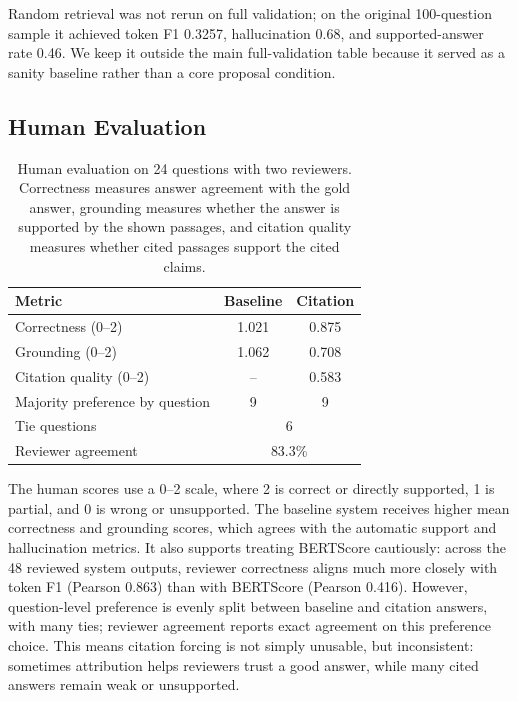 \documentclass[11pt]{article}
\begin{document}
Random retrieval was not rerun on full validation; on the original 100-question sample it achieved token F1 0.3257, hallucination 0.68, and supported-answer rate 0.46. We keep it outside the main full-validation table because it served as a sanity baseline rather than a core proposal condition.

\subsection{Human Evaluation}

\begin{table}[H]
\centering
\small
\begin{tabular}{lcc}
\toprule
Metric & Baseline & Citation \\
\midrule
Correctness (0--2) & 1.021 & 0.875 \\
Grounding (0--2) & 1.062 & 0.708 \\
Citation quality (0--2) & -- & 0.583 \\
\midrule
Majority preference by question & 9 & 9 \\
Tie questions & \multicolumn{2}{c}{6} \\
Reviewer agreement & \multicolumn{2}{c}{83.3\%} \\
\bottomrule
\end{tabular}
\caption{Human evaluation on 24 questions with two reviewers. Correctness measures answer agreement with the gold answer, grounding measures whether the answer is supported by the shown passages, and citation quality measures whether cited passages support the cited claims.}
\label{tab:human}
\end{table}

The human scores use a 0--2 scale, where 2 is correct or directly supported, 1 is partial, and 0 is wrong or unsupported. The baseline system receives higher mean correctness and grounding scores, which agrees with the automatic support and hallucination metrics. It also supports treating BERTScore cautiously: across the 48 reviewed system outputs, reviewer correctness aligns much more closely with token F1 (Pearson 0.863) than with BERTScore (Pearson 0.416). However, question-level preference is evenly split between baseline and citation answers, with many ties; reviewer agreement reports exact agreement on this preference choice. This means citation forcing is not simply unusable, but inconsistent: sometimes attribution helps reviewers trust a good answer, while many cited answers remain weak or unsupported.
\end{document}
